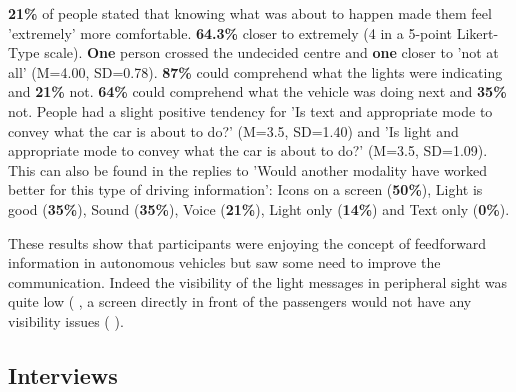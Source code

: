 \textbf{21\%} of people stated that knowing what was about to happen made them feel 'extremely' more comfortable. \textbf{64.3\%} closer to extremely (4 in a 5-point Likert-Type scale). \textbf{One} person crossed the undecided centre and \textbf{one} closer to 'not at all' (M=4.00, SD=0.78). \textbf{87\%} could comprehend what the lights were indicating and \textbf{21\%} not. \textbf{64\%} could comprehend what the vehicle was doing next and \textbf{35\%} not. People had a slight positive tendency for 'Is text and appropriate mode to convey what the car is about to do?' (M=3.5, SD=1.40) and  'Is light and appropriate mode to convey what the car is about to do?' (M=3.5, SD=1.09). This can also be found in the replies to 'Would another modality have worked better for this type of driving information': Icons on a screen (\textbf{50\%}), Light is good (\textbf{35\%}), Sound (\textbf{35\%}), Voice (\textbf{21\%}), Light only (\textbf{14\%}) and Text only (\textbf{0\%}). 

These results show that participants were enjoying the concept of feedforward information in autonomous vehicles but saw some need to improve the communication. Indeed the visibility of the light messages in peripheral sight was quite low ( , a screen directly in front of the passengers would not have any visibility issues ( ).

\subsection{Interviews}
\label{ssec:interviews}

